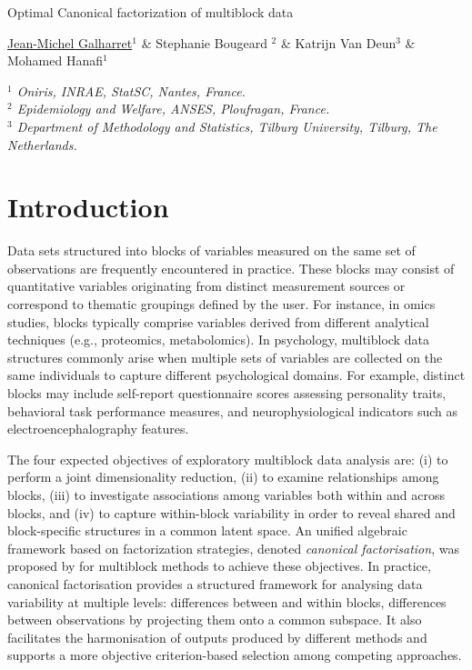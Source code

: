\documentclass[11pt]{article}
\begin{document}
\renewcommand{\headrulewidth}{0pt}



\begin{center}
{\Large
	{\sc Optimal Canonical factorization of multiblock data}
}
\bigskip

 \underline{Jean-Michel Galharret}$^{1}$ \& Stephanie Bougeard $^{2}$ \& Katrijn Van Deun$^{3}$ \& Mohamed Hanafi$^{1}$
\bigskip

{\it
$^{1}$ Oniris, INRAE, StatSC, Nantes, France. \\
$^{2}$ Epidemiology and Welfare, ANSES, Ploufragan, France. \\
$^{3}$ Department of Methodology and Statistics, Tilburg University, Tilburg, The Netherlands.
}
\end{center}
\bigskip


\section{Introduction}

Data sets structured into blocks of variables measured on the same set of observations are frequently encountered in practice. These blocks may consist of quantitative variables originating from distinct measurement sources or correspond to thematic groupings defined by the user. For instance, in omics studies, blocks typically comprise variables derived from different analytical techniques (e.g., proteomics, metabolomics). In psychology, multiblock data structures commonly arise when multiple sets of variables are collected on the same individuals to capture different psychological domains. For example, distinct blocks may include self-report questionnaire scores assessing personality traits, behavioral task performance measures, and neurophysiological indicators such as electroencephalography  features.

The four expected objectives of exploratory multiblock data analysis are: (i) to perform a joint dimensionality reduction, (ii) to examine relationships among blocks, (iii) to investigate associations among variables both within and across blocks, and (iv) to capture within-block variability in order to reveal shared and block-specific structures in a common latent space.  An unified algebraic framework based on factorization strategies, denoted \textit{canonical factorisation}, was proposed by \cite{Bougeard024} for multiblock methods to achieve these objectives. In practice, canonical factorisation provides a structured framework for analysing data variability at multiple levels: differences between and within blocks, differences between observations by projecting them onto a common subspace. It also facilitates the harmonisation of outputs produced by different methods and supports a more objective criterion-based selection among competing approaches. 
\end{document}
